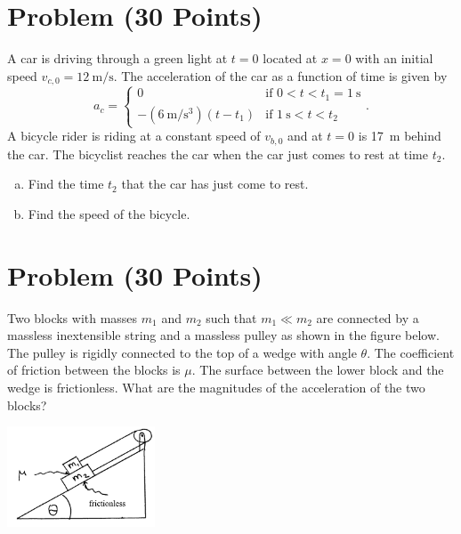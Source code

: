 \documentclass[problems]{esg8012exam}
\date{\today }
\begin{document}
\section{Problem \thesection\space(30 Points)}
  A car is driving through a green light at $t = 0$ located at $x = 0$ with an initial speed $v_{c, 0} = \SI{12}{\meter\per\second}$.  The acceleration of the car as a function of time is given by
  $$a_c = \begin{cases}
            0 & \text{if }0 < t < t_1 = \SI{1}{\second} \\
            -(\SI{6}{\meter\per\second\cubed})(t - t_1) & \text{if }\SI{1}{\second} < t < t_2
          \end{cases}
  .$$
  A bicycle rider is riding at a constant speed of $v_{b,0}$ and at $t = 0$ is \SI{17}{\meter} behind the car.  The bicyclist reaches the car when the car just comes to rest at time $t_2$.

  \begin{enumerate}[(a)]
    \item Find the time $t_2$ that the car has just come to rest.
    \item Find the speed of the bicycle.
  \end{enumerate}
\section{Problem \thesection\space(30 Points)}
  Two blocks with masses $m_1$ and $m_2$ such that $m_1 \ll m_2$ are connected by a massless inextensible string and a massless pulley as shown in the figure below.  The pulley is rigidly connected to the top of a wedge with angle $\theta$.  The coefficient of friction between the blocks is $\mu$.  The surface between the lower block and the wedge is frictionless.  What are the magnitudes of the acceleration of the two blocks?
  \begin{center}\includegraphics[width=0.33\textwidth]{exam1_p2_1}\end{center}
\end{document}
